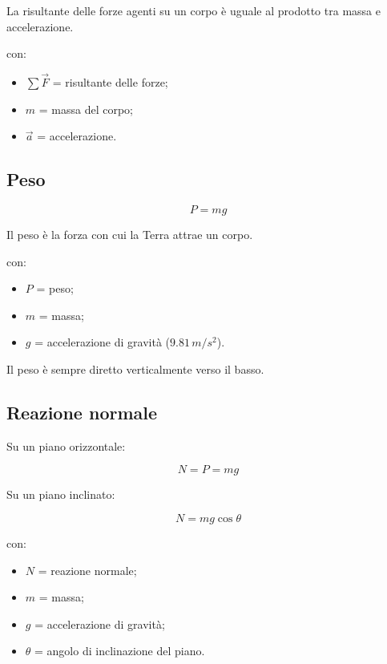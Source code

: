 \noindent La risultante delle forze agenti su un corpo è uguale al prodotto tra massa e accelerazione.

\noindent con:

\begin{itemize}
    \item $\sum \vec{F}$ = risultante delle forze;
    \item $m$ = massa del corpo;
    \item $\vec{a}$ = accelerazione.
\end{itemize}

\vspace{0.3cm}

\subsection{Peso}

\[
\boxed{P=mg}
\]

\noindent Il peso è la forza con cui la Terra attrae un corpo.

\noindent con:

\begin{itemize}
    \item $P$ = peso;
    \item $m$ = massa;
    \item $g$ = accelerazione di gravità ($9.81\,m/s^2$).
\end{itemize}

\noindent Il peso è sempre diretto verticalmente verso il basso.

\vspace{0.3cm}

\subsection{Reazione normale}

\noindent Su un piano orizzontale:

\[
\boxed{N=P=mg}
\]

\noindent Su un piano inclinato:

\[
\boxed{N=mg\cos\theta}
\]

\noindent con:

\begin{itemize}
    \item $N$ = reazione normale;
    \item $m$ = massa;
    \item $g$ = accelerazione di gravità;
    \item $\theta$ = angolo di inclinazione del piano.
\end{itemize}


